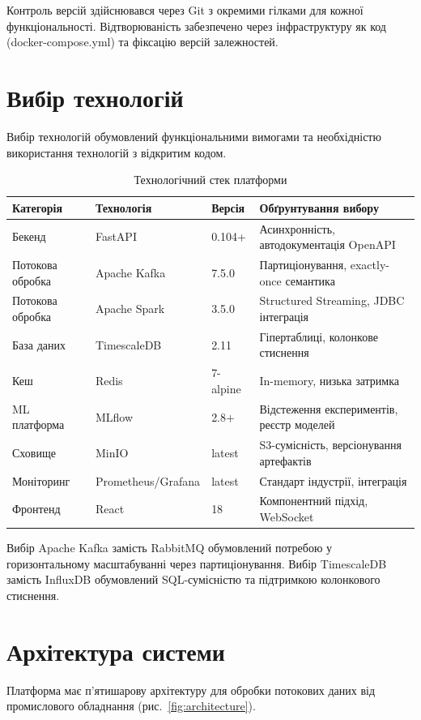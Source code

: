 Контроль версій здійснювався через Git з окремими гілками для кожної функціональності. Відтворюваність забезпечено через інфраструктуру як код (docker-compose.yml) та фіксацію версій залежностей.


\section{Вибір технологій}

Вибір технологій обумовлений функціональними вимогами та необхідністю використання технологій з відкритим кодом.

\begin{table}[h]
\caption{Технологічний стек платформи}
\label{tab:tech_stack}
\begin{tabular}{@{}llll@{}}
\toprule
Категорія & Технологія & Версія & Обґрунтування вибору \\
\midrule
Бекенд & FastAPI & 0.104+ & Асинхронність, автодокументація OpenAPI \\
Потокова обробка & Apache Kafka & 7.5.0 & Партиціонування, exactly-once семантика \\
Потокова обробка & Apache Spark & 3.5.0 & Structured Streaming, JDBC інтеграція \\
База даних & TimescaleDB & 2.11 & Гіпертаблиці, колонкове стиснення \\
Кеш & Redis & 7-alpine & In-memory, низька затримка \\
ML платформа & MLflow & 2.8+ & Відстеження експериментів, реєстр моделей \\
Сховище & MinIO & latest & S3-сумісність, версіонування артефактів \\
Моніторинг & Prometheus/Grafana & latest & Стандарт індустрії, інтеграція \\
Фронтенд & React & 18 & Компонентний підхід, WebSocket \\
\bottomrule
\end{tabular}
\end{table}

Вибір Apache Kafka замість RabbitMQ обумовлений потребою у горизонтальному масштабуванні через партиціонування. Вибір TimescaleDB замість InfluxDB обумовлений SQL-сумісністю та підтримкою колонкового стиснення.


\section{Архітектура системи}

Платформа має п'ятишарову архітектуру для обробки потокових даних від промислового обладнання (рис.~\ref{fig:architecture}).

